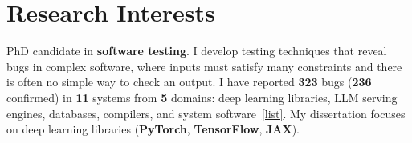 \section{Research Interests}

    \begin{onecolentry}
        PhD candidate in \textbf{software testing}. I develop testing techniques that reveal bugs in complex software, where inputs must satisfy many constraints and there is often no simple way to check an output. I have reported \textbf{323} bugs (\textbf{236} confirmed) in \textbf{11} systems from \textbf{5} domains: deep learning libraries, LLM serving engines, databases, compilers, and system software~\href{https://abidnazirisami.github.io/bugs/}{[list]}. My dissertation focuses on deep learning libraries (\textbf{PyTorch}, \textbf{TensorFlow}, \textbf{JAX}).
    \end{onecolentry}
